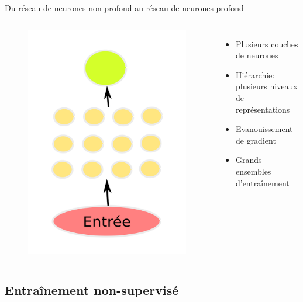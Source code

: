 \documentclass{beamer}
\begin{document}
\begin{frame}{Du réseau de neurones non profond au réseau de neurones profond}
\begin{columns}
{\begin{figure}
        \includegraphics[scale=0.1750]{../Figures/Deep}
      \end{figure}
    }
    \begin{itemize}
    \item Plusieurs couches de neurones
    \item Hiérarchie: plusieurs niveaux de représentations
    \item Evanouissement de gradient
    \item Grands ensembles d'entraînement
    \end{itemize}
  \end{columns}

\end{frame}

\subsection{Entraînement non-supervisé}
\end{document}
